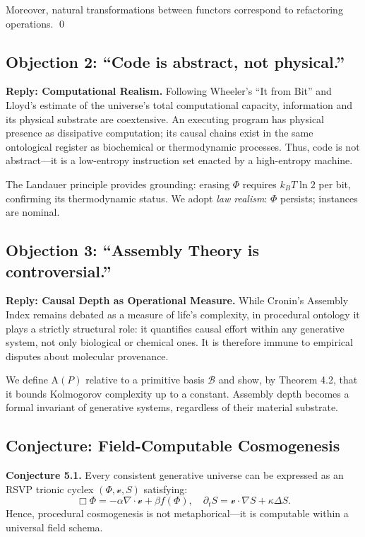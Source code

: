 \documentclass[12pt,a4paper]{article}
\theoremstyle{plain}
\theoremstyle{definition}
\theoremstyle{remark}
\newcommand{\Phifield}{\Phi}
\newcommand{\vfield}{\mathcal{v}}
\newcommand{\Sfield}{S}
\newcommand{\AI}{\mathrm{A}}
\begin{document}
Moreover, natural transformations between functors correspond to refactoring operations. \qed

\subsection{Objection 2: “Code is abstract, not physical.”}
\textbf{Reply: Computational Realism.}
Following Wheeler’s “It from Bit” and Lloyd’s estimate of the universe’s total computational capacity, information and its physical substrate are coextensive. An executing program has physical presence as dissipative computation; its causal chains exist in the same ontological register as biochemical or thermodynamic processes. Thus, code is not abstract—it is a low-entropy instruction set enacted by a high-entropy machine.

The Landauer principle provides grounding: erasing $\Phifield$ requires $k_B T \ln 2$ per bit, confirming its thermodynamic status. We adopt \emph{law realism}: $\Phifield$ persists; instances are nominal.

\subsection{Objection 3: “Assembly Theory is controversial.”}
\textbf{Reply: Causal Depth as Operational Measure.}
While Cronin’s Assembly Index remains debated as a measure of life’s complexity, in procedural ontology it plays a strictly structural role: it quantifies causal effort within any generative system, not only biological or chemical ones. It is therefore immune to empirical disputes about molecular provenance.

We define $\AI(P)$ relative to a primitive basis $\mathcal{B}$ and show, by Theorem 4.2, that it bounds Kolmogorov complexity up to a constant. Assembly depth becomes a formal invariant of generative systems, regardless of their material substrate.

\subsection{Conjecture: Field-Computable Cosmogenesis}
\label{conj:cosmogenesis}
\textbf{Conjecture 5.1.} Every consistent generative universe can be expressed as an RSVP trionic cyclex $(\Phifield,\vfield,\Sfield)$ satisfying:
\[
\Box \Phifield = -\alpha \nabla\!\cdot\!\vfield + \beta f(\Phifield),
\quad
\partial_t \Sfield = \vfield\!\cdot\!\nabla\Sfield + \kappa \Delta\Sfield.
\]
Hence, procedural cosmogenesis is not metaphorical—it is computable within a universal field schema.
\end{document}
